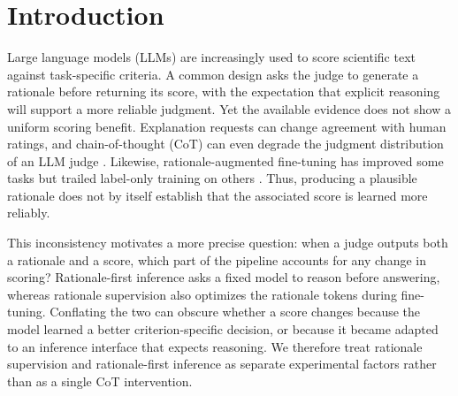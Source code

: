 \section{Introduction}
\label{sec:introduction}


Large language models (LLMs) are increasingly used to score scientific text
against task-specific criteria. A common design asks the judge to generate a
rationale before returning its score, with the expectation that explicit
reasoning will support a more reliable judgment. Yet the available evidence
does not show a uniform scoring benefit. Explanation requests can change
agreement with human ratings, and chain-of-thought (CoT) can even degrade the
judgment distribution of an LLM judge
\citep{chiang-lee-2023-closer,wang-etal-2025-improving-llm-judge}. Likewise,
rationale-augmented fine-tuning has improved some tasks but trailed label-only
training on others
\citep{hsieh-etal-2023-distilling,shi-etal-2025-rationales-nlu,
su-etal-2026-rationale-disease}. Thus, producing a plausible rationale does not
by itself establish that the associated score is learned more reliably.

This inconsistency motivates a more precise question: when a judge outputs
both a rationale and a score, which part of the pipeline accounts for any
change in scoring? Rationale-first inference asks a fixed model to reason
before answering, whereas rationale supervision also optimizes the rationale
tokens during fine-tuning. Conflating the two can obscure whether a score
changes because the model learned a better criterion-specific decision, or
because it became adapted to an inference interface that expects reasoning.
We therefore treat rationale supervision and rationale-first inference as
separate experimental factors rather than as a single CoT intervention.

